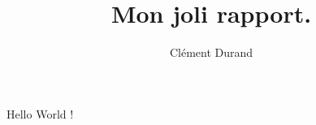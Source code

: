 \documentclass[a4paper, 11pt]{article}
\title{Mon joli rapport.}
\author{Clément Durand}
\begin{document}
\maketitle

Hello World !
\end{document}
